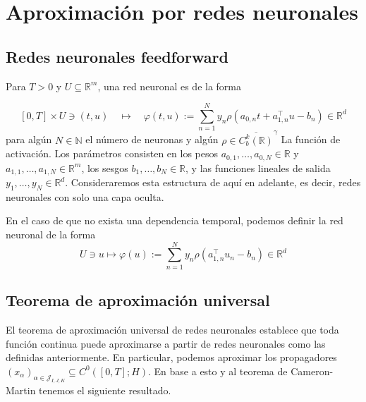 \section{Aproximación por redes neuronales}

\subsection{Redes neuronales feedforward}

\begin{defn}
  Para $T>0$ y $U \subseteq \mathbb{R}^m$, una red neuronal es de la forma

  $$
  [0, T] \times U \ni(t, u) \quad \mapsto \quad \varphi(t, u):=\sum_{n=1}^N y_n \rho\left(a_{0, n} t+a_{1, n}^{\top} u-b_n\right) \in \mathbb{R}^d
  $$
  para algún $N \in \mathbb{N}$ el número de neuronas y algún $\rho \in{\overline{C_b^k(\mathbb{R})}}^\gamma$ La función de activación. Los parámetros consisten en los pesos $a_{0,1}, \ldots, a_{0, N} \in \mathbb{R}$ y $a_{1,1}, \ldots, a_{1, N} \in \mathbb{R}^m$, los sesgos $b_1, \ldots, b_N \in \mathbb{R}$, y las funciones lineales de salida $y_1, \ldots, y_N \in \mathbb{R}^d$. Consideraremos esta estructura de aquí en adelante, es decir, redes neuronales con solo una capa oculta.

  En el caso de que no exista una dependencia temporal, podemos definir la red neuronal de la forma
  $$U \ni u \mapsto \varphi(u):=\sum_{n=1}^N y_n \rho\left(a_{1, n}^{\top} u_n-b_n\right) \in \mathbb{R}^d$$
\end{defn}

\subsection{Teorema de aproximación universal}

El teorema de aproximación universal de redes neuronales establece que toda función continua puede aproximarse a partir de redes neuronales como las definidas anteriormente. En particular, podemos aproximar los propagadores $\left(x_\alpha\right)_{\alpha \in \mathcal{J}_{I, J, K}} \subseteq C^0([0, T] ; H)$. En base a esto y al teorema de Cameron-Martin tenemos el siguiente resultado.

